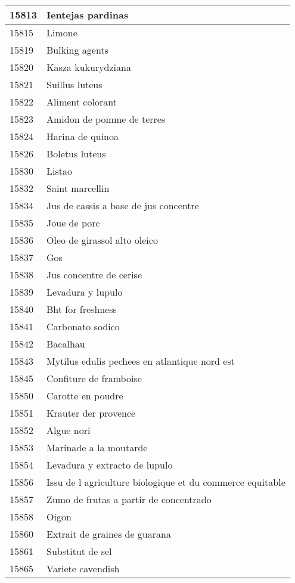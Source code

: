\begin{longtable}{|l|l|}
15813 & Ientejas pardinas \\ \hline 
15815 & Limone \\ \hline 
15819 & Bulking agents \\ \hline 
15820 & Kasza kukurydziana \\ \hline 
15821 & Suillus luteus \\ \hline 
15822 & Aliment colorant \\ \hline 
15823 & Amidon de pomme de terres \\ \hline 
15824 & Harina de quinoa \\ \hline 
15826 & Boletus luteus \\ \hline 
15830 & Listao \\ \hline 
15832 & Saint marcellin \\ \hline 
15834 & Jus de cassis a base de jus concentre \\ \hline 
15835 & Joue de porc \\ \hline 
15836 & Oleo de girassol alto oleico \\ \hline 
15837 & Gos \\ \hline 
15838 & Jus concentre de cerise \\ \hline 
15839 & Levadura y lupulo \\ \hline 
15840 & Bht for freshness \\ \hline 
15841 & Carbonato sodico \\ \hline 
15842 & Bacalhau \\ \hline 
15843 & Mytilus edulis pechees en atlantique nord est \\ \hline 
15845 & Confiture de framboise \\ \hline 
15850 & Carotte en poudre \\ \hline 
15851 & Krauter der provence \\ \hline 
15852 & Algue nori \\ \hline 
15853 & Marinade a la moutarde \\ \hline 
15854 & Levadura y extracto de lupulo \\ \hline 
15856 & Issu de l agriculture biologique et du commerce equitable \\ \hline 
15857 & Zumo de frutas a partir de concentrado \\ \hline 
15858 & Oigon \\ \hline 
15860 & Extrait de graines de guarana \\ \hline 
15861 & Substitut de sel \\ \hline 
15865 & Variete cavendish \\ \hline 

\end{longtable}
